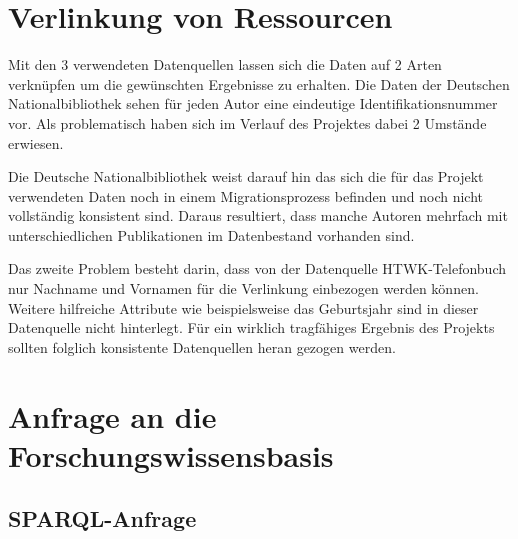\documentclass[parskip]{scrartcl}
\begin{document}
\section{Verlinkung von Ressourcen}

Mit den 3 verwendeten Datenquellen lassen sich die Daten auf 2 Arten verknüpfen um die gewünschten Ergebnisse zu erhalten. Die Daten der Deutschen Nationalbibliothek sehen für jeden Autor eine eindeutige Identifikationsnummer vor. Als problematisch haben sich im Verlauf des Projektes dabei 2 Umstände erwiesen. 

Die Deutsche Nationalbibliothek weist darauf hin das sich die für das Projekt verwendeten Daten noch in einem Migrationsprozess befinden und noch nicht vollständig konsistent sind. Daraus resultiert, dass manche Autoren mehrfach mit unterschiedlichen Publikationen im Datenbestand vorhanden sind. 

Das zweite Problem besteht darin, dass von der Datenquelle HTWK-Telefonbuch nur Nachname und Vornamen für die Verlinkung einbezogen werden können. Weitere hilfreiche Attribute wie beispielsweise das Geburtsjahr sind in dieser Datenquelle nicht hinterlegt. Für ein wirklich tragfähiges Ergebnis des Projekts sollten folglich konsistente Datenquellen heran gezogen werden.

\section{Anfrage an die Forschungswissensbasis}

\subsection{SPARQL-Anfrage}
\end{document}
